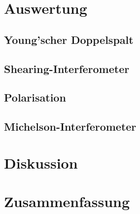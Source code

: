 \documentclass[ngerman]{scrartcl}
\begin{document}
\section{Auswertung}
\label{sec:auswertung}

\subsection{Young'scher Doppelspalt}
\label{sec:auswertung_doppelspalt}



\subsection{Shearing-Interferometer}
\label{sec:auswertung_shearing}

\subsection{Polarisation}
\label{sec:auswertung_polarisation}

\subsection{Michelson-Interferometer}
\label{sec:auswertung_michelson}




\section{Diskussion}
\label{sec:diskussion}


\section{Zusammenfassung}
\label{sec:zusammenfassung}


\clearpage
\printbibliography

\listoffigures

\listoftables
\end{document}
